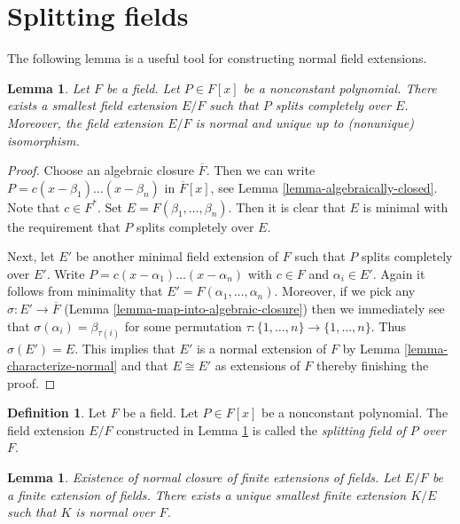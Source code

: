 \documentclass{stacks-project}
\newenvironment{slogan}{\comment}{\endcomment}
\theoremstyle{plain}
\newtheorem{lemma}[subsection]{Lemma}
\theoremstyle{definition}
\newtheorem{definition}[subsection]{Definition}
\theoremstyle{remark}
\numberwithin{equation}{subsection}
\begin{document}
\section{Splitting fields}
\label{section-splitting-fieds}

\noindent
The following lemma is a useful tool for constructing normal field extensions.

\begin{lemma}
\label{lemma-splitting-field}
Let $F$ be a field. Let $P \in F[x]$ be a nonconstant polynomial.
There exists a smallest field extension $E/F$ such that $P$
splits completely over $E$. Moreover, the field extension $E/F$ is normal
and unique up to (nonunique) isomorphism.
\end{lemma}

\begin{proof}
Choose an algebraic closure $\overline{F}$. Then we can write
$P = c (x - \beta_1) \ldots (x - \beta_n)$ in $\overline{F}[x]$, see
Lemma \ref{lemma-algebraically-closed}. Note that $c \in F^*$. Set
$E = F(\beta_1, \ldots, \beta_n)$. Then it is clear that $E$ is
minimal with the requirement that $P$ splits completely over $E$.

\medskip\noindent
Next, let $E'$ be another minimal field extension of $F$ such that
$P$ splits completely over $E'$. Write
$P = c (x - \alpha_1) \ldots (x - \alpha_n)$ with $c \in F$ and
$\alpha_i \in E'$. Again it follows from minimality that
$E' = F(\alpha_1, \ldots, \alpha_n)$. Moreover, if we pick
any $\sigma : E' \to \overline{F}$
(Lemma \ref{lemma-map-into-algebraic-closure})
then we immediately see that $\sigma(\alpha_i) = \beta_{\tau(i)}$
for some permutation $\tau : \{1, \ldots, n\} \to \{1, \ldots, n\}$.
Thus $\sigma(E') = E$. This implies that $E'$ is a normal extension
of $F$ by Lemma \ref{lemma-characterize-normal}
and that $E \cong E'$ as extensions of $F$ thereby finishing the proof.
\end{proof}

\begin{definition}
\label{definition-splitting-field}
Let $F$ be a field. Let $P \in F[x]$ be a nonconstant polynomial.
The field extension $E/F$ constructed in Lemma \ref{lemma-splitting-field}
is called the {\it splitting field of $P$ over $F$}.
\end{definition}

\begin{lemma}
\label{lemma-normal-closure}
\begin{slogan}
Existence of normal closure of finite extensions of fields.
\end{slogan}
Let $E/F$ be a finite extension of fields. There exists a unique
smallest finite extension $K/E$ such that $K$ is normal over $F$.
\end{lemma}
\end{document}

